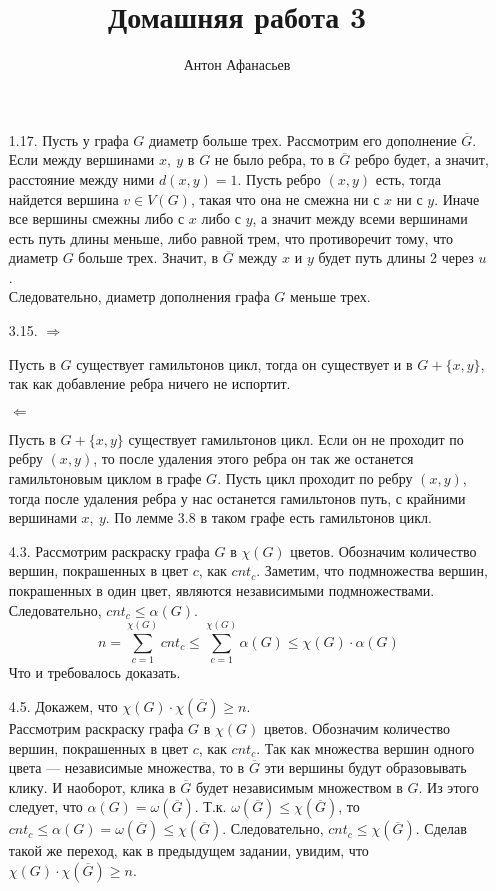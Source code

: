 \documentclass[10pt]{article}
\renewcommand{\leq}{\leqslant}
\renewcommand{\geq}{\geqslant}
\begin{document}
\title{Домашняя работа 3}
\author{Антон Афанасьев}
\maketitle

\begin{enumerate}

\item[1.17.] Пусть у графа $G$ диаметр больше трех. Рассмотрим его дополнение $\overline G$. Если между вершинами $x,\ y$ в $G$ не было ребра, то в $\overline G$ ребро будет, а значит, расстояние между ними $d(x, y)=1$. Пусть ребро $(x, y)$ есть, тогда найдется вершина $v \in V(G)$, такая что она не смежна ни с $x$ ни с $y$. Иначе все вершины смежны либо с $x$ либо с $y$, а значит между всеми вершинами есть путь длины меньше, либо равной трем, что противоречит тому, что диаметр $G$ больше трех. Значит, в $\overline G$ между $x$ и $y$ будет путь длины 2 через $u$.\\
Следовательно, диаметр дополнения графа $G$ меньше трех.

\item[3.15.] $\Rightarrow$

Пусть в $G$ существует гамильтонов цикл, тогда он существует и в $G+\{x,y\}$, так как добавление ребра ничего не испортит.

$\Leftarrow$

Пусть в $G+\{x,y\}$ существует гамильтонов цикл. Если он не проходит по ребру $(x, y)$, то после удаления этого ребра он так же останется гамильтоновым циклом в графе $G$. Пусть цикл проходит по ребру $(x, y)$, тогда после удаления ребра у нас останется гамильтонов путь, с крайними вершинами $x,\ y$. По лемме 3.8 в таком графе есть гамильтонов цикл.

\item[4.3.] Рассмотрим раскраску графа $G$ в $\chi(G)$ цветов. Обозначим количество вершин, покрашенных в цвет $c$, как $cnt_c$. Заметим, что подмножества вершин, покрашенных в один цвет, являются независимыми подмножествами. Следовательно, $cnt_c \leq \alpha(G)$. $$n = \sum_{c=1}^{\chi(G)} cnt_c \leq \sum_{c=1}^{\chi(G)} \alpha(G) \leq \chi(G) \cdot \alpha(G)$$
Что и требовалось доказать.

\item[4.5.] Докажем, что $\chi(G) \cdot \chi(\overline G) \geq n$.\\
Рассмотрим раскраску графа $G$ в $\chi(G)$ цветов. Обозначим количество вершин, покрашенных в цвет $c$, как $cnt_c$. Так как множества вершин одного цвета --- независимые множества, то в $\overline G$ эти вершины будут образовывать клику. И наоборот, клика в $\overline G$ будет независимым множеством в $G$. Из этого следует, что $\alpha(G) = \omega(\overline G)$. Т.к. $\omega(\overline G) \leq \chi(\overline G)$, то $cnt_c \leq \alpha(G) = \omega(\overline G) \leq \chi(\overline G)$. Следовательно, $cnt_c \leq \chi(\overline G)$. Сделав такой же переход, как в предыдущем задании, увидим, что $\chi(G) \cdot \chi(\overline G) \geq n$.


\end{enumerate}
\end{document}
